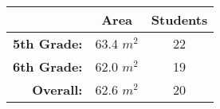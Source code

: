 \documentclass{amsart}
\begin{document}
\begin{table}[h]
    \begin{center}
        \renewcommand\arraystretch{1.25}
        \begin{tabular}{|r|c|c|}
            \hline
            &\textbf{Area} &\textbf{Students}\\\hline
            \textbf{5th Grade:} &63.4 $m^2$ &22\\\hline
            \textbf{6th Grade:} &62.0 $m^2$ &19\\\hline
            \textbf{Overall:} &62.6 $m^2$ &20\\\hline
        \end{tabular}
    \end{center}
\end{table}
\end{document}
